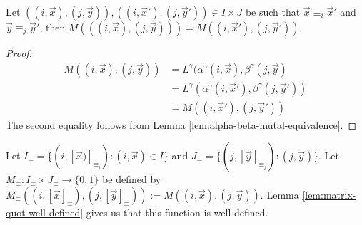 \documentclass[../paper.tex]{subfiles}
\begin{document}
\begin{lem}
  Let $((i, \vec{x}), (j, \vec{y})), ((i, \vec{x}'), (j, \vec{y}')) \in I \times
  J$ be such that $\vec{x} \equiv_i \vec{x}'$ and $\vec{y} \equiv_j \vec{y}'$,
  then $M(((i, \vec{x}), (j, \vec{y}))) = M((i, \vec{x}'), (j, \vec{y}'))$.
  \label{lem:matrix-quot-well-defined}
\end{lem}
\begin{proof}
  \begin{align*}
    M((i, \vec{x}),(j, \vec{y})) &= L^{\gamma}(\alpha^{\gamma}(i, \vec{x}), \beta^{\gamma}(j, \vec{y}) \\
                                 &= L^{\gamma}(\alpha^{\gamma}(i, \vec{x}'), \beta^{\gamma}(j, \vec{y}'))\\
                                 &= M((i, \vec{x}'), (j, \vec{y}'))
  \end{align*}
  The second equality follows from Lemma \ref{lem:alpha-beta-mutal-equivalence}.
\end{proof}

Let $I_{\equiv} = \{(i, [\vec{x})]_{\equiv_i}) : (i, \vec{x}) \in I\}$ and
$J_\equiv = \{(j, [\vec{y}]_{\equiv_j}) : (j, \vec{y})\}$. Let $M_{\equiv} :
I_{\equiv} \times J_{\equiv} \rightarrow \{0,1\}$ be defined by $M_\equiv ((i,
[\vec{x}]_\equiv), (j, [\vec{y}]_\equiv)) := M((i,\vec{x}), (j, \vec{y}))$.
Lemma \ref{lem:matrix-quot-well-defined} gives us that this function is
well-defined.
\end{document}
